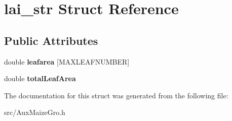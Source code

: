 \hypertarget{structlai__str}{\section{lai\-\_\-str Struct Reference}
\label{structlai__str}
}
\subsection*{Public Attributes}
\begin{DoxyCompactItemize}
\item 
\hypertarget{structlai__str_a6f84a05e6d24579ac5222851f0476a66}{double {\bfseries leafarea} \mbox{[}M\-A\-X\-L\-E\-A\-F\-N\-U\-M\-B\-E\-R\mbox{]}}\label{structlai__str_a6f84a05e6d24579ac5222851f0476a66}

\item 
\hypertarget{structlai__str_a92963f45cc57caaff1dc44f653cc7b2f}{double {\bfseries total\-Leaf\-Area}}\label{structlai__str_a92963f45cc57caaff1dc44f653cc7b2f}

\end{DoxyCompactItemize}


The documentation for this struct was generated from the following file\-:\begin{DoxyCompactItemize}
\item 
src/Aux\-Maize\-Gro.\-h\end{DoxyCompactItemize}
